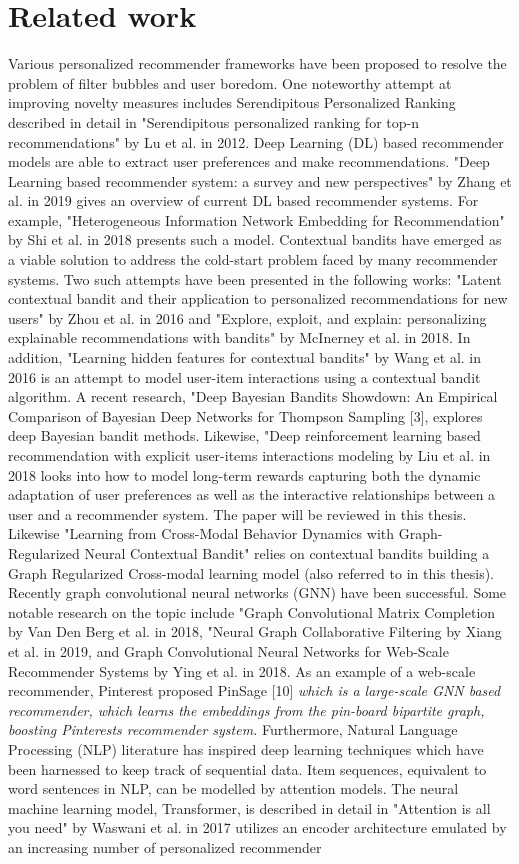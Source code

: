 \section{Related work}
Various personalized recommender frameworks have been proposed to resolve the problem of filter bubbles and user boredom. One noteworthy attempt at improving novelty measures includes Serendipitous Personalized Ranking described in detail in "Serendipitous personalized ranking for top-n recommendations" by Lu et al. in 2012. Deep Learning (DL) based recommender models are able to extract user preferences and make recommendations. "Deep Learning based recommender system: a survey and new perspectives" by Zhang et al. in 2019 gives an overview of current DL based recommender systems. For example, "Heterogeneous Information Network Embedding for Recommendation" by Shi et al. in 2018 presents such a model. Contextual bandits have emerged as a viable solution to address the cold-start problem faced by many recommender systems. Two such attempts  have been presented in the following works: "Latent contextual bandit and their application to personalized recommendations for new users" by Zhou et al. in 2016 and "Explore, exploit, and explain: personalizing explainable recommendations with bandits" by McInerney et al. in 2018. In addition, "Learning hidden features for contextual bandits" by Wang et al. in 2016 is an attempt to model user-item interactions using a contextual bandit algorithm. A recent research, "Deep Bayesian Bandits Showdown: An Empirical Comparison of Bayesian Deep Networks for Thompson Sampling [3], explores deep Bayesian bandit methods. Likewise, "Deep reinforcement learning based recommendation with explicit user-items interactions modeling by Liu et al. in 2018 looks into how to model long-term rewards capturing both the dynamic adaptation of user preferences as well as the interactive relationships between a user and a recommender system. The paper will be reviewed in this thesis. Likewise "Learning from Cross-Modal Behavior Dynamics with Graph-Regularized Neural Contextual Bandit" relies on contextual bandits building a Graph Regularized Cross-modal learning model (also referred to in this thesis). Recently graph convolutional neural networks (GNN) have been successful. Some notable research on the topic include "Graph Convolutional Matrix Completion by Van Den Berg et al. in 2018, "Neural Graph Collaborative Filtering by Xiang et al. in 2019, and Graph Convolutional Neural Networks for Web-Scale Recommender Systems by Ying et al. in 2018. As an example of a web-scale recommender, Pinterest proposed PinSage [10]  \textit{which is a large-scale GNN based recommender, which learns the embeddings from the pin-board bipartite graph, boosting Pinterests recommender system.} Furthermore, Natural Language Processing (NLP) literature has inspired deep learning techniques which have been harnessed to keep track of sequential data. Item sequences, equivalent to word sentences in NLP, can be modelled by attention models. The neural machine learning model, Transformer, is described in detail in "Attention is all you need" by Waswani et al. in 2017 utilizes an encoder architecture emulated by an increasing number of personalized recommender 